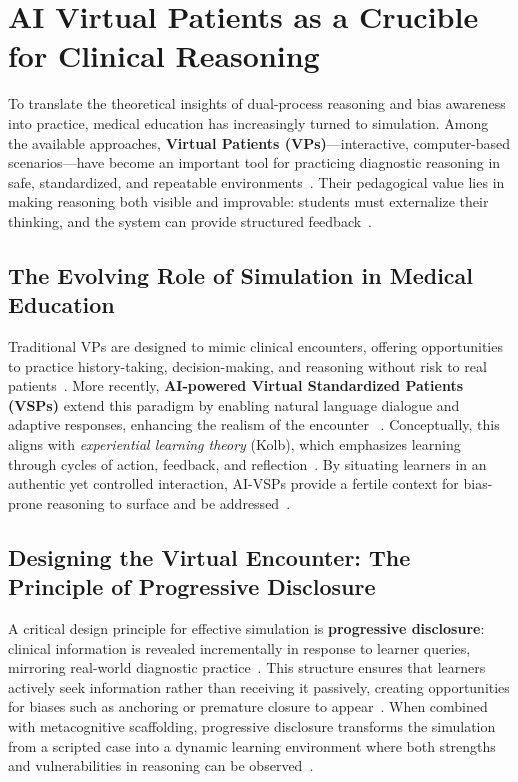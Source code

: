 \section{AI Virtual Patients as a Crucible for Clinical Reasoning}

To translate the theoretical insights of dual-process reasoning and bias awareness
into practice, medical education has increasingly turned to simulation. Among the
available approaches, \textbf{Virtual Patients (VPs)}—interactive, computer-based
scenarios—have become an important tool for practicing diagnostic reasoning in
safe, standardized, and repeatable environments~\parencite{Chan2019,Potter2024}.
Their pedagogical value lies in making reasoning both visible and improvable:
students must externalize their thinking, and the system can provide structured
feedback~\parencite{Sapci2020}.

\subsection{The Evolving Role of Simulation in Medical Education}

Traditional VPs are designed to mimic clinical encounters, offering opportunities
to practice history-taking, decision-making, and reasoning without risk to real
patients~\parencite{Potter2024}. More recently, \textbf{AI-powered Virtual
Standardized Patients (VSPs)} extend this paradigm by enabling natural language
dialogue and adaptive responses, enhancing the realism of the encounter
~\parencite{Chan2019,Lee2024}. Conceptually, this aligns with
\emph{experiential learning theory} (Kolb), which emphasizes learning through
cycles of action, feedback, and reflection~\parencite{book}. By situating learners
in an authentic yet controlled interaction, AI-VSPs provide a fertile context for
bias-prone reasoning to surface and be addressed~\parencite{Carl2023}.

\subsection{Designing the Virtual Encounter: The Principle of Progressive Disclosure}

A critical design principle for effective simulation is \textbf{progressive
disclosure}: clinical information is revealed incrementally in response to learner
queries, mirroring real-world diagnostic practice~\parencite{Iqbal2021}. This
structure ensures that learners actively seek information rather than receiving it
passively, creating opportunities for biases such as anchoring or premature closure
to appear~\parencite{graber_diagnostic_2005,croskerry_importance_2003}. When
combined with metacognitive scaffolding, progressive disclosure transforms the
simulation from a scripted case into a dynamic learning environment where both
strengths and vulnerabilities in reasoning can be observed~\parencite{mamede_structure_2004}.


